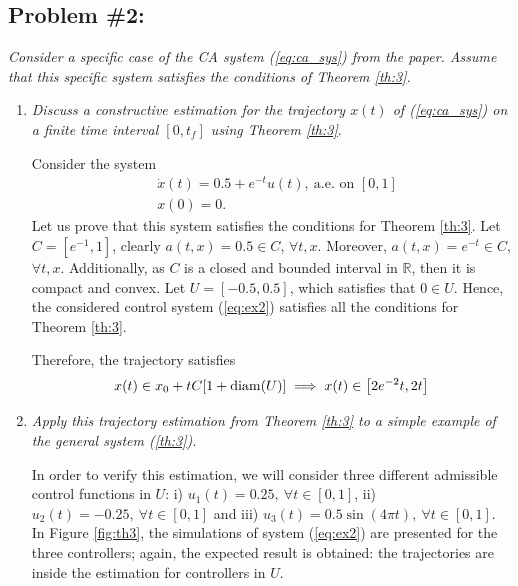 \documentclass[11pt,letterpaper]{article}
\newcommand{\RR}{{\mathbb{R}}}
\let\originalleft\left
\let\originalright\right
\renewcommand{\left}{\mathopen{}\mathclose\bgroup\originalleft}
\renewcommand{\right}{\aftergroup\egroup\originalright}
\theoremstyle{definition}
\begin{document}
\subsection*{Problem \#2:}
\textit{
Consider a specific case of the CA system (\ref{eq:ca_sys}) from the paper. Assume that this specific system satisfies the conditions of Theorem \ref{th:3}.}
\begin{enumerate}[label=\alph*)]
    \item \textit{Discuss a constructive estimation for the trajectory $x(t)$ of (\ref{eq:ca_sys}) on a finite time interval $[0,t_f]$ using Theorem \ref{th:3}}.
    
    Consider the system
    \begin{equation}\label{eq:ex2}
        \begin{split}
            &\dot{x}(t)=0.5+e^{-t}u(t),\ \text{a.e. on } [0,1]\\
            &x(0)=0.
        \end{split}
    \end{equation}
    Let us prove that this system satisfies the conditions for Theorem \ref{th:3}. Let $C=[e^{-1},1]$, clearly $a(t,x)=0.5\in C$, $\forall t,x$. Moreover, $a(t,x)=e^{-t}\in C$, $\forall t,x$. Additionally, as $C$ is a closed and bounded interval in $\RR$, then it is compact and convex. Let $U=[-0.5,0.5]$, which satisfies that $0\in U$. Hence, the considered control system (\ref{eq:ex2}) satisfies all the conditions for Theorem \ref{th:3}.
    
    Therefore, the trajectory satisfies 
    \begin{equation}
        x(t)\in x_0+tC[1+\mathrm{diam}(U)]\implies x(t)\in \left[2e^{-2}t, 2t\right]
    \end{equation}
    
    \item \textit{Apply this trajectory estimation from Theorem \ref{th:3} to a simple example of the general system (\ref{th:3}).}
    
    In order to verify this estimation, we will consider three different admissible control functions in $U$: i) $u_1(t)=0.25,\ \forall t\in[0,1]$, ii) $u_2(t)=-0.25,\ \forall t\in[0,1]$ and iii) $u_3(t)=0.5\sin(4\pi t),\ \forall t\in[0,1]$. In Figure \ref{fig:th3}, the simulations of system (\ref{eq:ex2}) are presented for the three controllers; again, the expected result is obtained: the trajectories are inside the estimation for controllers in $U$.
    

\end{enumerate}
\end{document}
